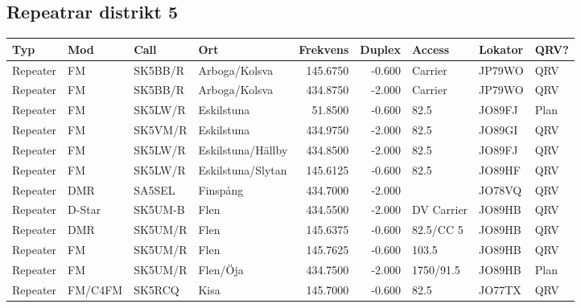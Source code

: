 \begin{landscape}
\clearpage

\subsection{Repeatrar distrikt 5}

\begin{longtable}{llllrrlll}
	\bf Typ  & \bf Mod & \bf Call & \bf Ort              & \bf Frekvens & \bf Duplex & \bf Access        & \bf Lokator & \bf QRV? \\ \hline
	\endhead
	Repeater & FM      & SK5BB/R  & Arboga/Kolsva        &     145.6750 &     -0.600 & Carrier           & JP79WO      & QRV      \\
	Repeater & FM      & SK5BB/R  & Arboga/Kolsva        &     434.8750 &     -2.000 & Carrier           & JP79WO      & QRV      \\
	Repeater & FM      & SK5LW/R  & Eskilstuna           &      51.8500 &     -0.600 & 82.5              & JO89FJ      & Plan     \\
	Repeater & FM      & SK5VM/R  & Eskilstuna           &     434.9750 &     -2.000 & 82.5              & JO89GI      & QRV      \\
	Repeater & FM      & SK5LW/R  & Eskilstuna/Hällby    &     434.8500 &     -2.000 & 82.5              & JO89FJ      & QRV      \\
	Repeater & FM      & SK5LW/R  & Eskilstuna/Slytan    &     145.6125 &     -0.600 & 82.5              & JO89HF      & QRV      \\
	Repeater & DMR     & SA5SEL   & Finspång             &     434.7000 &     -2.000 &                   & JO78VQ      & QRV      \\
	Repeater & D-Star  & SK5UM-B  & Flen                 &     434.5500 &     -2.000 & DV Carrier        & JO89HB      & QRV      \\
	Repeater & DMR     & SK5UM/R  & Flen                 &     145.6375 &     -0.600 & 82.5/CC 5         & JO89HB      & QRV      \\
	Repeater & FM      & SK5UM/R  & Flen                 &     145.7625 &     -0.600 & 103.5             & JO89HB      & QRV      \\
	Repeater & FM      & SK5UM/R  & Flen/Öja             &     434.7500 &     -2.000 & 1750/91.5         & JO89HB      & Plan     \\
	Repeater & FM/C4FM & SK5RCQ   & Kisa                 &     145.7000 &     -0.600 & 82.5              & JO77TX      & QRV      \\

\end{longtable}
\end{landscape}
